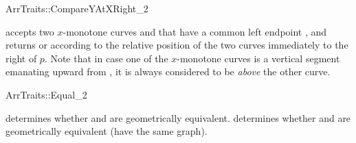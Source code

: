 \ccRefPageBegin
\begin{ccRefConcept}{ArrTraits::CompareYAtXRight_2}

\ccHasModels{}

  {accepts two $x$-monotone curves  and 
  that have a common left endpoint , and returns  or  according to the relative position of the two
  curves immediately to the right of $p$. Note that in case one of the
  $x$-monotone curves is a vertical segment emanating upward from
  , it is always considered to be {\sl above} the other curve.}
\end{ccRefConcept}
\ccRefPageEnd

\ccRefPageBegin
\begin{ccRefConcept}{ArrTraits::Equal_2}

\ccHasModels{}

  {determines whether  and  are geometrically 
  equivalent.}
\ccGlue
{}
  {determines whether  and  are
  geometrically equivalent (have the same graph).}
\end{ccRefConcept}
\ccRefPageEnd
